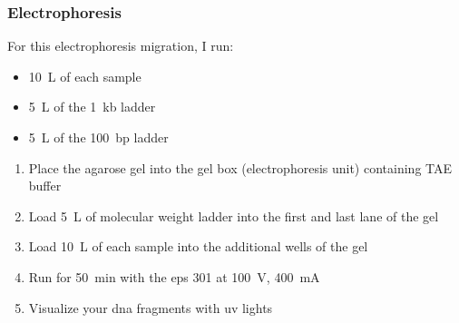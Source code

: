 \subsubsection{Electrophoresis}

For this electrophoresis migration, I run:
\begin{itemize}
\item 10~\textmu L of each sample
\item 5~\textmu L of the 1~kb ladder
\item 5~\textmu L of the 100~bp ladder
\end{itemize}

\begin{enumerate}
\item Place the agarose gel into the gel box (electrophoresis unit) containing TAE buffer
\item Load 5~\textmu L of molecular weight ladder into the first and last lane of the gel
\item Load 10~\textmu L of each sample into the additional wells of the gel
\item Run for 50~min with the \gls{eps} 301 at 100~V, 400~mA
\item Visualize your \gls{dna} fragments with \gls{uv} lights
\end{enumerate}

